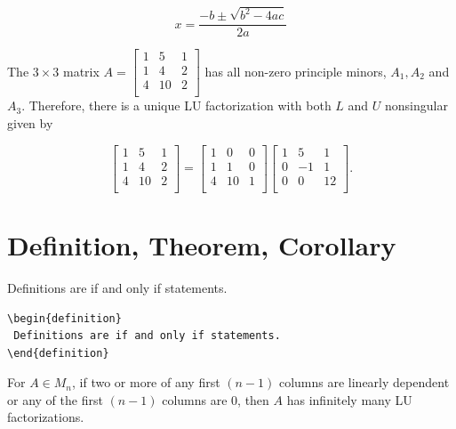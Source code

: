 \begin{equation}\label{eqn:quad}
x = \frac{-b \pm \sqrt{b^2 - 4ac}}{2a}
\end{equation}
  
\begin{example}\normalfont
The $3 \times 3$ matrix  
$A =  \begin{bmatrix}
1 & 5 & 1\\
1 & 4 & 2\\
4 & 10 & 2\\
\end{bmatrix}
$
has all non-zero principle minors, $A_1, A_2$ and $A_3$.  Therefore,  there is a unique LU factorization with both $L$ and $U$ nonsingular given by 
\end{example}
\[
\begin{bmatrix}
1 & 5 & 1\\
1 & 4 & 2\\
4 & 10 & 2\\
\end{bmatrix}
=
\begin{bmatrix}
1 & 0 & 0\\
1 & 1 & 0\\
4 & 10 & 1\\
\end{bmatrix}
\begin{bmatrix}
1 & 5 & 1\\
0 & -1 & 1\\
0 & 0 & 12\\
\end{bmatrix}.
\]



\section{Definition, Theorem, Corollary}

\begin{definition}
 Definitions are if and only if statements.  
\end{definition}

\begin{verbatim}
\begin{definition}
 Definitions are if and only if statements.  
\end{definition}
\end{verbatim}

\begin{theorem}
{For $A \in M_n$, if two or more of any first $(n-1)$ columns are linearly dependent or any of the first $(n-1)$ columns are 0, then $A$ has infinitely many LU factorizations.}
\end{theorem}

